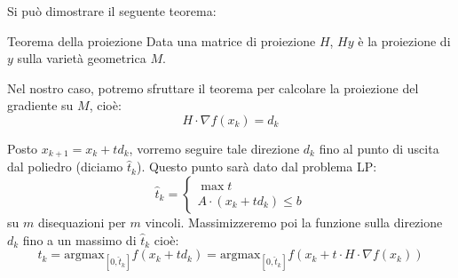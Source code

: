 \documentclass[a4paper,11pt]{article}
\begin{document}
Si può dimostrare il seguente teorema:
\begin{theorem}{Teorema della proiezione}
	Data una matrice di proiezione $H$, $H y$ è la proiezione di $y$ sulla varietà geometrica $M$.
\end{theorem}

Nel nostro caso, potremo sfruttare il teorema per calcolare la proiezione del gradiente su $M$, cioè:
$$
H \cdot \nabla f(x_k) = d_k
$$


Posto $x_{k +1} = x_k + t d_k$, vorremo seguire tale direzione $d_k$ fino al punto di uscita dal poliedro (diciamo $\hat{t}_k$).
Questo punto sarà dato dal problema LP:
\[
	\hat{t}_k = 
	\begin{cases}
			\max t \\ 
			A\cdot(x_k + t d_k) \leq b
	\end{cases}
\]
su $m$ disequazioni per $m$ vincoli.
Massimizzeremo poi la funzione sulla direzione $d_k$ fino a un massimo di $\hat{t}_k$ cioè:
$$
t_k = \mathrm{argmax}_{[0, \hat{t}_k]} f(x_k + t d_k) = \mathrm{argmax}_{[0, \hat{t}_k]} f(x_k + t \cdot H \cdot \nabla f(x_k)) 
$$
\end{document}
